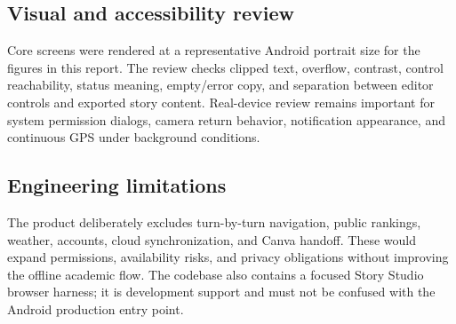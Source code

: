 \subsection{Visual and accessibility review}
Core screens were rendered at a representative Android portrait size for the
figures in this report. The review checks clipped text, overflow, contrast,
control reachability, status meaning, empty/error copy, and separation between
editor controls and exported story content. Real-device review remains important
for system permission dialogs, camera return behavior, notification appearance,
and continuous GPS under background conditions.

\subsection{Engineering limitations}
The product deliberately excludes turn-by-turn navigation, public rankings,
weather, accounts, cloud synchronization, and Canva handoff. These would expand
permissions, availability risks, and privacy obligations without improving the
offline academic flow. The codebase also contains a focused Story Studio browser
harness; it is development support and must not be confused with the Android
production entry point.
